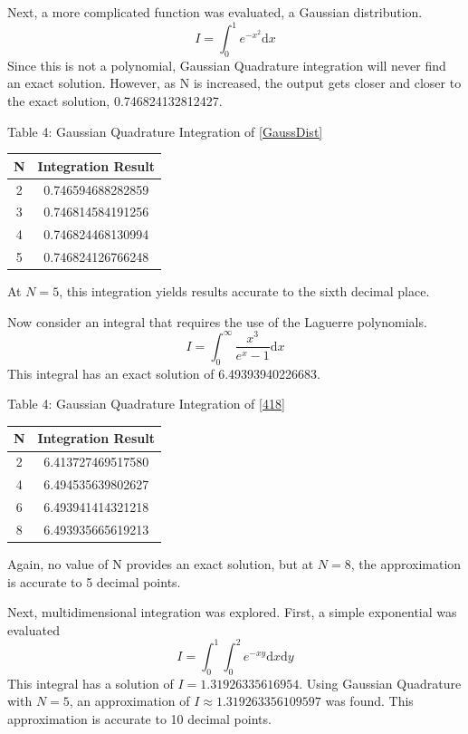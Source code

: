\documentclass[12pt]{article}
\begin{document}
Next, a more complicated function was evaluated, a Gaussian distribution.
\begin{equation}
\label{GaussDist}
I = \int_0^1 e^{-x^2} \mathrm{d}x
\end{equation}
Since this is not a polynomial, Gaussian Quadrature integration will never find an exact solution.  However, as N is increased, the output gets closer and closer to the exact solution, 0.746824132812427.
\begin{center}
Table 4:  Gaussian Quadrature Integration of \eqref{GaussDist} \\
\begin{tabular}{ | c | c |}
\hline
N & Integration Result \\ \hline
2&	0.746594688282859\\ \hline
3&	0.746814584191256\\ \hline
4&	0.746824468130994\\ \hline
5&	0.746824126766248\\ \hline
\end{tabular}
\end{center}
At $N=5$, this integration yields results accurate to the sixth decimal place.  

Now consider an integral that requires the use of the Laguerre polynomials.
\begin{equation}
\label{418}
I = \int_0^\infty \frac{x^3}{e^x-1} \mathrm{d}x
\end{equation}
This integral has an exact solution of 6.49393940226683.
\begin{center}
Table 4:  Gaussian Quadrature Integration of \eqref{418} \\
\begin{tabular}{ | c | c |}
\hline
N & Integration Result \\ \hline
2&	6.413727469517580\\ \hline
4&	6.494535639802627\\ \hline
6&	6.493941414321218\\ \hline
8&	6.493935665619213\\ \hline
\end{tabular}
\end{center}
Again, no value of N provides an exact solution, but at $N=8$, the approximation is accurate to 5 decimal points.

Next, multidimensional integration was explored.  First, a simple exponential was evaluated
\begin{equation}
\label{2DInt}
I = \int_0^1\int_0^2 e^{-xy} \mathrm{d}x \mathrm{d}y
\end{equation}
This integral has a solution of $I = 1.31926335616954$.  Using Gaussian Quadrature with $N=5$, an approximation of $I \approx 1.319263356109597$ was found.  This approximation is accurate to 10 decimal points.
\end{document}
